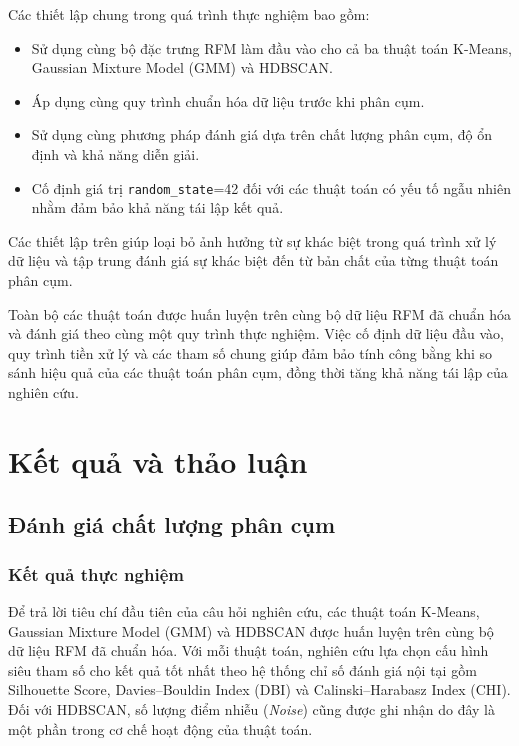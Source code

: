 \documentclass[12pt]{ai_conquer2026}
\begin{document}
Các thiết lập chung trong quá trình thực nghiệm bao gồm:

\begin{itemize}
    \item Sử dụng cùng bộ đặc trưng RFM làm đầu vào cho cả ba thuật toán K-Means, Gaussian Mixture Model (GMM) và HDBSCAN.
    \item Áp dụng cùng quy trình chuẩn hóa dữ liệu trước khi phân cụm.
    \item Sử dụng cùng phương pháp đánh giá dựa trên chất lượng phân cụm, độ ổn định và khả năng diễn giải.
    \item Cố định giá trị \texttt{random\_state}=42 đối với các thuật toán có yếu tố ngẫu nhiên nhằm đảm bảo khả năng tái lập kết quả.
\end{itemize}

Các thiết lập trên giúp loại bỏ ảnh hưởng từ sự khác biệt trong quá trình xử lý dữ liệu và tập trung đánh giá sự khác biệt đến từ bản chất của từng thuật toán phân cụm.

Toàn bộ các thuật toán được huấn luyện trên cùng bộ dữ liệu RFM đã chuẩn hóa và đánh giá theo cùng một quy trình thực nghiệm. Việc cố định dữ liệu đầu vào, quy trình tiền xử lý và các tham số chung giúp đảm bảo tính công bằng khi so sánh hiệu quả của các thuật toán phân cụm, đồng thời tăng khả năng tái lập của nghiên cứu.

\section{Kết quả và thảo luận}

\subsection{Đánh giá chất lượng phân cụm}

\subsubsection{Kết quả thực nghiệm}

Để trả lời tiêu chí đầu tiên của câu hỏi nghiên cứu, các thuật toán K-Means, Gaussian Mixture Model (GMM) và HDBSCAN được huấn luyện trên cùng bộ dữ liệu RFM đã chuẩn hóa. Với mỗi thuật toán, nghiên cứu lựa chọn cấu hình siêu tham số cho kết quả tốt nhất theo hệ thống chỉ số đánh giá nội tại gồm Silhouette Score, Davies--Bouldin Index (DBI) và Calinski--Harabasz Index (CHI). Đối với HDBSCAN, số lượng điểm nhiễu (\textit{Noise}) cũng được ghi nhận do đây là một phần trong cơ chế hoạt động của thuật toán.
\end{document}
